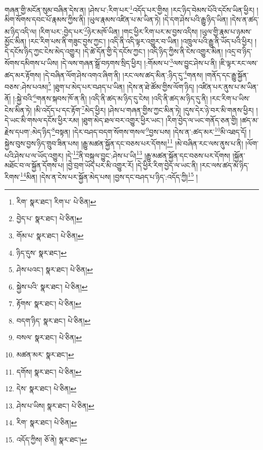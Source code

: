 གཞན་གྱི་མངོན་སུམ་བཞིན་དེས་ན། །ཤེས་པ་:རིག་པར་\footnote{རིག་  སྣར་ཐང་། རིག་པ་  པེ་ཅིན། }འདོད་པར་གྱིས། །རང་ཉིད་བེམས་པོའི་དངོས་ཡིན་ཕྱིར། །མིག་སོགས་དབང་པོ་རྣམས་ཀྱིས་ནི། །ཡུལ་རྣམས་འཛིན་པ་མ་ཡིན་ཏེ། །དེ་དག་ཤེས་པའི་རྒྱུ་ཉིད་ཡིན། །དེས་ན་ཚད་མ་ཉིད་འདི་ལ། །རིག་པར་:བྱེད་པར་\footnote{བྱེད་པ་  སྣར་ཐང་།  པེ་ཅིན། }ཉེར་མཁོ་ཡིན། །གང་ཕྱིར་རིག་པར་མ་བྱས་འདིས། །ཡུལ་གྱི་རྣམ་པ་ཉམས་མྱོང་མིན། །རང་རིག་པས་ནི་གཟུང་བྱས་ཀྱང་། །འདི་ནི་འདི་ལྟར་འགྱུར་བ་ཡིན། །འཁྲུལ་པའི་རྒྱུ་ནི་ཡོད་པའི་ཕྱིར། །དེ་དངོས་ཉིད་ཀྱང་ངེས་མེད་འགྱུར། །དེ་ཚེ་དོན་གྱི་དེ་དངོས་ཀྱང་། །འདི་ཉིད་ཀྱིས་ནི་ངེས་འགྱུར་མིན། །འདྲ་བ་ཉིད་སོགས་དམིགས་པ་ཡིས། །དེ་ལས་གཞན་སྒྲོ་བཏགས་སྲིད་ཕྱིར། །:གོམས་པ་\footnote{གོམ་པ་  སྣར་ཐང་།  པེ་ཅིན། }ལས་བྱུང་ཤེས་པ་ནི། །ཇི་ལྟར་རང་ལས་ཚད་མར་རྟོགས། །དེ་བཞིན་ལོག་ཤེས་འགའ་ཞིག་ནི། །རང་ལས་ཚད་མིན་:ཉིད་དུ་\footnote{ཉིད་དུས་  སྣར་ཐང་། }གནས། །གནོད་དང་རྒྱུ་སྐྱོན་བཅས་:ཤེས་པའམ།\footnote{ཤེས་པའང་།  སྣར་ཐང་།  པེ་ཅིན། } །ཐུག་པ་མེད་པར་བཤད་པ་ཡིན། །དེས་ན་ཐེ་ཚོམ་གྱིས་ལོག་ཉིད། །འཛིན་པར་ནུས་པ་མ་ཡིན་ནོ། །:སྐྱེ་བའི་\footnote{སྐྱེས་པའི་  སྣར་ཐང་།  པེ་ཅིན། }གནས་སྐབས་ཁོ་ན་ནི། །འདི་ནི་ཚད་མ་ཉིད་དུ་ངེས། །འདི་ནི་ཚད་མ་ཉིད་དུ་ནི། །རང་རིག་པ་ཡིས་ངེས་མིན་ཏེ། །མི་འདོད་པ་དང་རྟོག་\footnote{རྟོགས་  སྣར་ཐང་།  པེ་ཅིན། }མེད་ཕྱིར། །ཤེས་པ་གཞན་གྱིས་ཀྱང་མིན་ཏེ། །དུས་དེར་ཉེ་བར་མི་གནས་ཕྱིར། །དེ་ཡང་མི་གསལ་དངོས་ཕྱིར་རམ། །ཐུག་མེད་ཐལ་བར་འགྱུར་ཕྱིར་ཡང་། །རིག་བྱེད་ལ་ཡང་གནོད་ཅན་གྱི། །ཚད་མ་རྗེས་དཔག་:མེད་ཉིད་\footnote{བདག་ཉིད་  སྣར་ཐང་།  པེ་ཅིན། }བསྟན། །དེར་བཤད་བདག་སོགས་གསལ་\footnote{བསལ་  སྣར་ཐང་།  པེ་ཅིན། }བྱས་པས། །དེས་ན་:ཚད་མར་\footnote{མཚན་མར་  སྣར་ཐང་། }མི་འཐད་དོ། །སྐྱེས་བུས་བྱས་ཉིད་གྲུབ་ཟིན་པས། །རྒྱུ་མཚན་སྐྱོན་དང་བཅས་པར་དོགས།\footnote{དགོས།  སྣར་ཐང་།  པེ་ཅིན། } །མེ་བཞིན་རང་ལས་ནུས་པ་ནི། །ལོག་པའི་ཤེས་པ་ལ་ཡོད་འགྱུར། །དེ་\footnote{དེས་  སྣར་ཐང་།  པེ་ཅིན། }ནི་བསྐུལ་བྱུང་:ཤེས་པ་ཡི།\footnote{ཤེས་པ་ཡིས།  སྣར་ཐང་།  པེ་ཅིན། } །རྒྱུ་མཚན་སྐྱོན་དང་བཅས་པར་དོགས། །སྐྱོན་མཐོང་བ་ལ་སྐྱོན་དོགས་པ། །བྱེ་བྲག་ཡོད་པར་མི་འགྱུར་རོ། །དེ་ཕྱིར་རིག་བྱེད་ལ་ཡང་ནི། །རང་ལས་ཚད་མ་ཉིད་རིགས་\footnote{རིག་  སྣར་ཐང་།  པེ་ཅིན། }མིན། །དེས་ན་ངེས་པར་སྐྱོན་མེད་པས། །བྱས་དང་བཤད་པ་ཉིད་:འདོད་ཀྱི།\footnote{འདོད་ཀྱིས།  ཅོ་ནེ།  སྣར་ཐང་། } །
